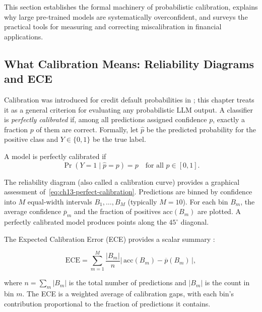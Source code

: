 This section establishes the formal machinery of probabilistic calibration, explains
why large pre-trained models are systematically overconfident, and surveys the practical
tools for measuring and correcting miscalibration in financial applications.

\subsection{What Calibration Means: Reliability Diagrams and ECE}
\label{sec:ch13-calibration-reliability-diagrams}

Calibration was introduced for credit default probabilities in ;
this chapter treats it as a general criterion for evaluating any probabilistic LLM output.
A classifier is \emph{perfectly calibrated} if, among all predictions assigned
confidence $p$, exactly a fraction $p$ of them are correct. Formally, let $\hat{p}$ be
the predicted probability for the positive class and $Y \in \{0,1\}$ be the true label.

\begin{definition}
\label{def:ch13-perfect-calibration}
A model is perfectly calibrated if
\begin{equation}
  \Pr(Y = 1 \mid \hat{p} = p) = p \quad \text{for all } p \in [0, 1].
  \label{eq:ch13-perfect-calibration}
\end{equation}
\end{definition}

The reliability diagram (also called a calibration curve) provides a graphical
assessment of~\eqref{eq:ch13-perfect-calibration}. Predictions are binned by
confidence into $M$ equal-width intervals $B_1, \ldots, B_M$ (typically $M = 10$).
For each bin $B_m$, the average confidence $\overline{p}_m$ and the fraction of
positives $\text{acc}(B_m)$ are plotted. A perfectly calibrated model produces points
along the $45^\circ$ diagonal.

The Expected Calibration Error (ECE) provides a scalar summary \cite{guo2017calibration}:

\begin{equation}
  \text{ECE} = \sum_{m=1}^{M} \frac{|B_m|}{n} \left|\, \text{acc}(B_m) -
  \overline{p}(B_m) \,\right|,
  \label{eq:ch13-ece}
\end{equation}

where $n = \sum_m |B_m|$ is the total number of predictions and $|B_m|$ is the count
in bin $m$. The ECE is a weighted average of calibration gaps, with each bin's
contribution proportional to the fraction of predictions it contains.

